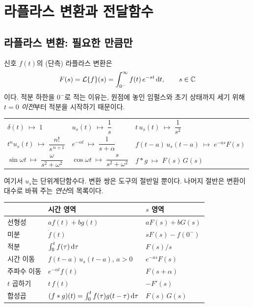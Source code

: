\documentclass[11pt]{article}
\begin{document}

\section{라플라스 변환과 전달함수}

\subsection{라플라스 변환: 필요한 만큼만}
신호 $f(t)$의 (단측) 라플라스 변환은
\begin{equation}\label{eq:laplace}
   F(s) = \mathcal{L}\{f\}(s) = \int_{0^{-}}^{\infty} f(t)\,e^{-st}\,\mathrm{d} t ,
   \qquad s\in\mathbb{C}
\end{equation}
이다. 적분 하한을 $0^{-}$로 적는 이유는, 원점에 놓인 임펄스와 초기 상태까지
세기 위해 $t=0$ \emph{이전}부터 적분을 시작하기 때문이다.

\smallskip
\begin{center}
\renewcommand{\arraystretch}{2.0}
\begin{tabular}{@{}l@{\qquad\qquad}l@{\qquad\qquad}l@{}}
\toprule
$\delta(t) \;\mapsto\; 1$
  & $u_{s}(t) \;\mapsto\; \dfrac{1}{s}$
  & $t\,u_{s}(t) \;\mapsto\; \dfrac{1}{s^{2}}$\\[6pt]
$t^{n}u_{s}(t) \;\mapsto\; \dfrac{n!}{s^{\,n+1}}$
  & $e^{-\alpha t} \;\mapsto\; \dfrac{1}{s+\alpha}$
  & $f(t-a)\,u_{s}(t-a) \;\mapsto\; e^{-as}F(s)$\\[6pt]
$\sin\omega t \;\mapsto\; \dfrac{\omega}{s^{2}+\omega^{2}}$
  & $\cos\omega t \;\mapsto\; \dfrac{s}{s^{2}+\omega^{2}}$
  & $f*g \;\mapsto\; F(s)\,G(s)$\\
\bottomrule
\end{tabular}
\end{center}

\smallskip\noindent
여기서 $u_{s}$는 단위계단함수다. 변환 쌍은 도구의 절반일 뿐이다. 나머지 절반은
변환이 대수로 바꿔 주는 \emph{연산}의 목록이다.

\begin{center}\small
\renewcommand{\arraystretch}{1.55}
\begin{tabular}{@{}lll@{}}
\toprule
& 시간 영역 & $s$ 영역\\
\midrule
선형성        & $a f(t)+b g(t)$            & $aF(s)+bG(s)$\\
미분  & $\dot f(t)$                & $sF(s)-f(0^{-})$\\
적분      & $\int_{0}^{t} f(\tau)\,\mathrm{d}\tau$ & $F(s)/s$\\
시간 이동       & $f(t-a)\,u_s(t-a)$, $a>0$  & $e^{-as}F(s)$\\
주파수 이동  & $e^{-\alpha t}f(t)$        & $F(s+\alpha)$\\
$t$ 곱하기 & $t\,f(t)$             & $-F'(s)$\\
합성곱      & $(f*g)(t)=\int_0^t f(\tau)g(t-\tau)\,\mathrm{d}\tau$ & $F(s)\,G(s)$\\
\bottomrule
\end{tabular}
\end{center}
\end{document}
